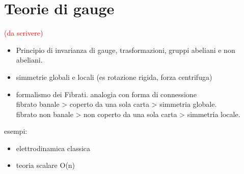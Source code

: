 \chapter{Teorie di gauge}
\textcolor{red}{(da scrivere)}\\
\begin{itemize}
   \item Principio di invarianza di gauge, trasformazioni, gruppi abeliani e non abeliani.\\
   \item simmetrie globali e locali (es rotazione rigida, forza centrifuga)\\
   \item formalismo dei Fibrati. analogia con forma di connessione\\
   fibrato banale > coperto da una sola carta > simmetria globale.\\
   fibrato non banale > non coperto da una sola carta > simmetria locale.
\end{itemize}

esempi:
 \begin{itemize}
   \item elettrodinamica classica\\
   \item teoria scalare O(n)\\
\end{itemize}

